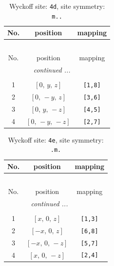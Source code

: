 \documentclass[fleqn,8pt]{jsarticle}
\begin{document}
\begin{longtable}{ccc}
\caption{Wyckoff site: {\tt 4d}, site symmetry: {\tt m..}}
 \\
 \hline \hline
No. & position & mapping \\ \hline \endfirsthead

\multicolumn{2}{l}{\tablename\ \thetable{}} \\
 \hline \hline
No. & position & mapping \\ \hline \endhead

 \hline \hline
\multicolumn{2}{r}{\footnotesize\it continued ...} \\ \endfoot

 \hline \hline
\multicolumn{2}{r}{} \\ \endlastfoot

1 & $\left[ 0,\, y,\, z \right]$ & {\tt [1,8]} \\ \hline
2 & $\left[ 0,\, - y,\, z \right]$ & {\tt [3,6]} \\ \hline
3 & $\left[ 0,\, y,\, - z \right]$ & {\tt [4,5]} \\ \hline
4 & $\left[ 0,\, - y,\, - z \right]$ & {\tt [2,7]} \\
\end{longtable}
\renewcommand{\arraystretch}{1.2}
\begin{longtable}{ccc}
\caption{Wyckoff site: {\tt 4e}, site symmetry: {\tt .m.}}
 \\
 \hline \hline
No. & position & mapping \\ \hline \endfirsthead

\multicolumn{2}{l}{\tablename\ \thetable{}} \\
 \hline \hline
No. & position & mapping \\ \hline \endhead

 \hline \hline
\multicolumn{2}{r}{\footnotesize\it continued ...} \\ \endfoot

 \hline \hline
\multicolumn{2}{r}{} \\ \endlastfoot

1 & $\left[ x,\, 0,\, z \right]$ & {\tt [1,3]} \\ \hline
2 & $\left[ - x,\, 0,\, z \right]$ & {\tt [6,8]} \\ \hline
3 & $\left[ - x,\, 0,\, - z \right]$ & {\tt [5,7]} \\ \hline
4 & $\left[ x,\, 0,\, - z \right]$ & {\tt [2,4]} \\
\end{longtable}
\renewcommand{\arraystretch}{1.2}
\end{document}
